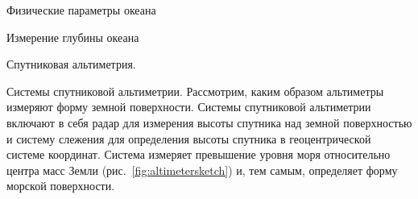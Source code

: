 \begin{chapter}{Физические параметры океана}
\begin{section}{Измерение глубины океана}
\begin{paragraph}{Спутниковая альтиметрия.}
\begin{subparagraph}{Системы спутниковой альтиметрии.}
Рассмотрим, каким образом альтиметры измеряют форму земной
поверхности. Системы спутниковой альтиметрии включают в себя радар для
измерения высоты спутника над земной поверхностью и систему слежения
для определения высоты спутника в геоцентрической системе
координат. Система измеряет превышение уровня моря относительно центра
масс Земли (рис.~\ref{fig:altimetersketch}) и, тем самым, определяет 
форму морской поверхности.
%


\end{subparagraph}
\end{paragraph}
\end{section}
\end{chapter}
